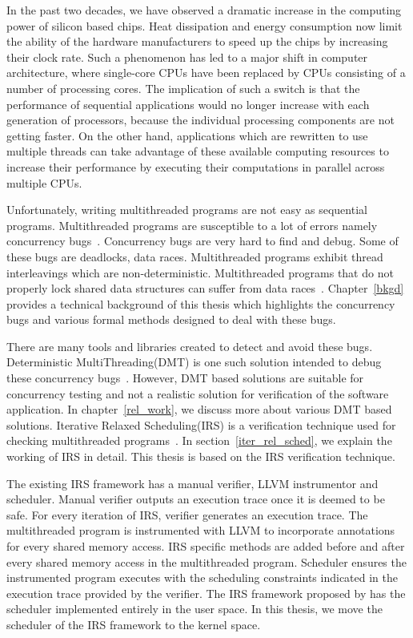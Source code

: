 In the past two decades, we have observed a dramatic increase in the computing power of silicon based chips. 
Heat dissipation and energy consumption now limit the ability of the hardware manufacturers to speed up the chips by increasing their clock rate. 
Such a phenomenon has led to a major shift in computer architecture, where single-core CPUs have been replaced by CPUs consisting of a number of processing cores. 
The implication of such a switch is that the performance of sequential applications would no longer increase with each generation of processors, because the individual processing components are not getting faster. 
On the other hand, applications which are rewritten to use multiple threads can take advantage of these available computing resources to increase their performance by executing their computations in parallel across multiple CPUs. 

Unfortunately, writing multithreaded programs are not easy as sequential programs. 
Multithreaded programs are susceptible to a lot of errors namely concurrency bugs~\citep{carver2005modern}. 
Concurrency bugs are very hard to find and debug. 
Some of these bugs are deadlocks, data races. 
Multithreaded programs exhibit thread interleavings which are non-deterministic. 
Multithreaded programs that do not properly lock shared data structures can suffer from data races~\citep{netzer1992race}. 
Chapter~\ref{bkgd} provides a technical background of this thesis which highlights the concurrency bugs and various formal methods designed to deal with these bugs.

There are many tools and libraries created to detect and avoid these bugs. 
Deterministic MultiThreading(DMT) is one such solution intended to debug these concurrency bugs~\citep{dthreads}. 
However, DMT based solutions are suitable for concurrency testing and not a realistic solution for verification of the software application. 
In chapter~\ref{rel_work}, we discuss more about various DMT based solutions.  
Iterative Relaxed Scheduling(IRS) is a verification technique used for checking multithreaded programs~\citep{metzler2017quick}. 
In section~\ref{iter_rel_sched}, we explain the working of IRS in detail. 
This thesis is based on the IRS verification technique. 

The existing IRS framework has a manual verifier, LLVM instrumentor and scheduler. 
Manual verifier outputs an execution trace once it is deemed to be safe. 
For every iteration of IRS, verifier generates an execution trace. 
The multithreaded program is instrumented with LLVM to incorporate annotations for every shared memory access. 
IRS specific methods are added before and after every shared memory access in the multithreaded program. 
Scheduler ensures the instrumented program executes with the scheduling constraints indicated in the execution trace provided by the verifier. 
The IRS framework proposed by \citet{metzler2017quick} has the scheduler implemented entirely in the user space. 
In this thesis, we move the scheduler of the IRS framework to the kernel space. 

